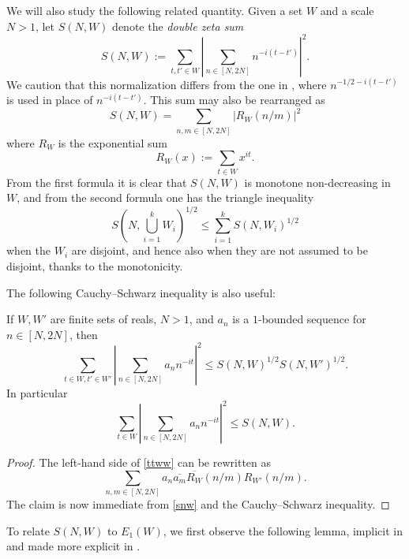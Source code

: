 We will also study the following related quantity.  Given a set $W$ and a scale $N>1$, let $S(N,W)$ denote the \emph{double zeta sum}
\begin{equation}\label{snw-def}
     S(N,W) := \sum_{t,t' \in W} \left|\sum_{n \in [N,2N]} n^{-i(t-t')} \right|^2.
\end{equation}
We caution that this normalization differs from the one in \cite{ivic}, where $n^{-1/2-i(t-t')}$ is used in place of $n^{-i(t-t')}$.  This sum may also be rearranged as
\begin{equation}\label{snw}
 S(N,W) = \sum_{n,m \in [N,2N]} |R_W(n/m)|^2
\end{equation}
where $R_W$ is the exponential sum
$$ R_W(x) := \sum_{t \in W} x^{it}.$$
From the first formula it is clear that $S(N,W)$ is monotone non-decreasing in $W$, and from the second formula one has the triangle inequality
\begin{equation}\label{S-triangle}
S\left(N, \bigcup_{i=1}^k W_i \right)^{1/2} \leq \sum_{i=1}^k S(N,W_i)^{1/2}
\end{equation}
when the $W_i$ are disjoint, and hence also when they are not assumed to be disjoint, thanks to the monotonicity.

The following Cauchy--Schwarz inequality is also useful:

\begin{lemma}\label{cauchy-schwarz} \cite[Lemma 3.4]{bourgain_dirichlet_2000} If $W,W'$ are finite sets of reals, $N>1$, and $a_n$ is a $1$-bounded sequence for $n \in [N,2N]$, then
\begin{equation}\label{ttww}
     \sum_{t \in W, t' \in W'} \left|\sum_{n \in [N,2N]} a_n n^{-it} \right|^2 \leq S(N,W)^{1/2} S(N,W')^{1/2}.
\end{equation}
In particular
$$ \sum_{t \in W} \left|\sum_{n \in [N,2N]} a_n n^{-it} \right|^2 \leq S(N,W).$$
\end{lemma}

\begin{proof}  The left-hand side of \eqref{ttww} can be rewritten as
    $$ \sum_{n,m \in [N,2N]} a_n \overline{a_m} \overline{R_W}(n/m) R_{W'}(n/m).$$
The claim is now immediate from \eqref{snw} and the Cauchy--Schwarz inequality.
\end{proof}


To relate $S(N,W)$ to $E_1(W)$, we first observe the following lemma, implicit in \cite{heath_brown_consecutive_II} and made more explicit in \cite[Lemma 11.4]{guth-maynard}.

